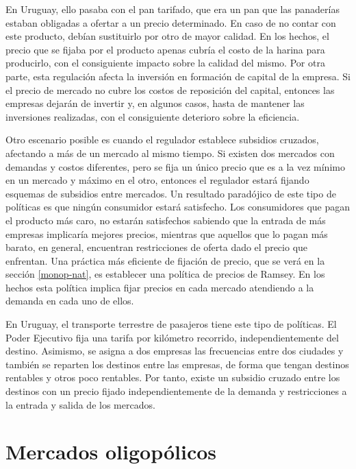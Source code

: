 \documentclass[
  12pt,
  spanish,
]{book}
\begin{document}
En Uruguay, ello pasaba con el pan tarifado, que era un pan que las panaderías estaban obligadas a ofertar a un precio determinado. En caso de no contar con este producto, debían sustituirlo por otro de mayor calidad. En los hechos, el precio que se fijaba por el producto apenas cubría el costo de la harina para producirlo, con el consiguiente impacto sobre la calidad del mismo. Por otra parte, esta regulación afecta la inversión en formación de capital de la empresa. Si el precio de mercado no cubre los costos de reposición del capital, entonces las empresas dejarán de invertir y, en algunos casos, hasta de mantener las inversiones realizadas, con el consiguiente deterioro sobre la eficiencia.

Otro escenario posible es cuando el regulador establece subsidios cruzados, afectando a más de un mercado al mismo tiempo. Si existen dos mercados con demandas y costos diferentes, pero se fija un único precio que es a la vez mínimo en un mercado y máximo en el otro, entonces el regulador estará fijando esquemas de subsidios entre mercados. Un resultado paradójico de este tipo de políticas es que ningún consumidor estará satisfecho. Los consumidores que pagan el producto más caro, no estarán satisfechos sabiendo que la entrada de más empresas implicaría mejores precios, mientras que aquellos que lo pagan más barato, en general, encuentran restricciones de oferta dado el precio que enfrentan. Una práctica más eficiente de fijación de precio, que se verá en la sección \ref{monop-nat}, es establecer una política de precios de Ramsey. En los hechos esta política implica fijar precios en cada mercado atendiendo a la demanda en cada uno de ellos.

En Uruguay, el transporte terrestre de pasajeros tiene este tipo de políticas. El Poder Ejecutivo fija una tarifa por kilómetro recorrido, independientemente del destino. Asimismo, se asigna a dos empresas las frecuencias entre dos ciudades y también se reparten los destinos entre las empresas, de forma que tengan destinos rentables y otros poco rentables. Por tanto, existe un subsidio cruzado entre los destinos con un precio fijado independientemente de la demanda y restricciones a la entrada y salida de los mercados.

\hypertarget{mercados-oligopuxf3licos}{%
\section{Mercados oligopólicos}\label{mercados-oligopuxf3licos}}
\end{document}
